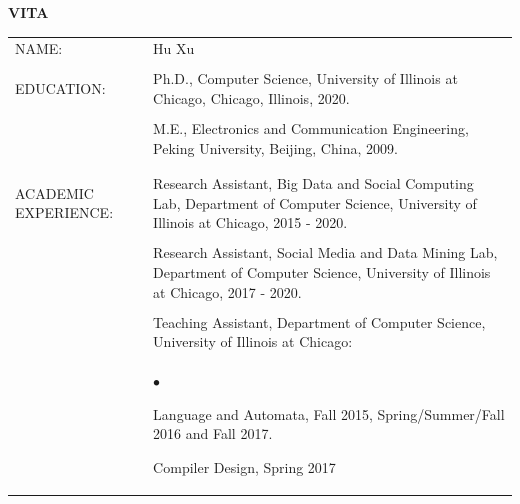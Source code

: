 \documentclass{uicthesi}
\newcommand{\squishlist}{
   \begin{list}{$\bullet$}
    { \setlength{\itemsep}{-.1ex}      \setlength{\parsep}{0ex}
      \setlength{\topsep}{0ex}       \setlength{\partopsep}{0ex}
      \setlength{\leftmargin}{.8em} \setlength{\labelwidth}{1em}
      \setlength{\labelsep}{0.5em} } }
\newcommand{\squishend}{\end{list}}
\begin{document}
\newpage
\clearpage
\pagestyle{pageontop}
\thispagestyle{pageonbottom}
\begin{large}
\begin{center}
{\bfseries VITA}
\end{center}
\end{large}
\begin{tabular}{p{2.8cm}p{10.5cm}}
NAME: & Hu Xu  \\ 
    &\\
EDUCATION:  &Ph.D., Computer Science, University of Illinois at Chicago, Chicago, Illinois, 2020. \\  
            &\\
            &M.E., Electronics and Communication Engineering, Peking University, Beijing, China, 2009.\\
            &\\
            &\\
ACADEMIC EXPERIENCE:  &Research Assistant, Big Data and Social Computing Lab, Department of Computer Science, University of Illinois at Chicago, 2015 - 2020. \\
            &\\
            &Research Assistant, Social Media and Data Mining Lab, Department of Computer Science, University of Illinois at Chicago, 2017 - 2020. \\
            &\\
            &Teaching Assistant, Department of Computer Science, University of Illinois at Chicago: \\
            &\squishlist            
            \item Language and Automata, Fall 2015, Spring/Summer/Fall 2016 and Fall 2017.    
            \item Compiler Design, Spring 2017 
            \squishend \\

 \end{tabular}
\end{document}
